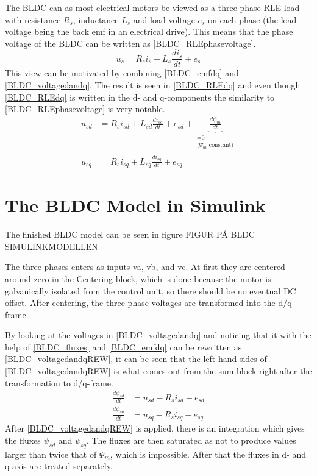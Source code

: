 \documentclass{LTHthesis}
\begin{document}
The BLDC can as most electrical motors be viewed as a three-phase RLE-load with resistance $R_{s}$, inductance $L_{s}$ and load voltage $e_{s}$ on each phase (the load voltage being the back emf in an electrical drive). This means that the phase voltage of the BLDC can be written as \eqref{BLDC_RLEphasevoltage}.
\begin{equation} \label{BLDC_RLEphasevoltage}
u_{s}=R_{s}i_{s}+L_{s}\frac{di_{s}}{dt}+e_{s}
\end{equation}
This view can be motivated by combining \eqref{BLDC_emfdq} and \eqref{BLDC_voltagedandq}. The result is seen in \eqref{BLDC_RLEdq} and even though \eqref{BLDC_RLEdq} is written in the d- and q-components the similarity to \eqref{BLDC_RLEphasevoltage} is very notable.
\begin{subequations} \label{BLDC_RLEdq}
\begin{align}
u_{sd}&=R_si_{sd}+L_{sd}\frac{di_{sd}}{dt}+e_{sd}+\underbrace{\frac{d\psi_m}{dt}}_{\substack{\text{=0}\\\text{$\big(\Psi_m$ constant$\big)$}}}\\
u_{sq}&=R_si_{sq}+L_{sq}\frac{di_{sq}}{dt}+e_{sq}
\end{align}
\end{subequations}

\section{The BLDC Model in Simulink}
The finished BLDC model can be seen in figure FIGUR PÅ BLDC SIMULINKMODELLEN

The three phases enters as inputs va, vb, and vc. At first they are centered around zero in the Centering-block, which is done because the motor is galvanically isolated from the control unit, so there should be no eventual DC offset. After centering, the three phase voltages are transformed into the d/q-frame. 

By looking at the voltages in \eqref{BLDC_voltagedandq} and noticing that it with the help of \eqref{BLDC_fluxes} and \eqref{BLDC_emfdq} can be rewritten as \eqref{BLDC_voltagedandqREW}, it can be seen that the left hand sides of \eqref{BLDC_voltagedandqREW} is what comes out from the sum-block right after the transformation to d/q-frame.
\begin{subequations} \label{BLDC_voltagedandqREW}
\begin{align}
\frac{d\psi_{sd}}{dt}&=u_{sd}-R_si_{sd}-e_{sd}\\
\frac{d\psi_{sq}}{dt}&=u_{sq}-R_si_{sq}-e_{sq}
\end{align}
\end{subequations}
After \eqref{BLDC_voltagedandqREW} is applied, there is an integration which gives the fluxes $\psi_{sd}$ and $\psi_{sq}$. The fluxes are then saturated as not to produce values larger than twice that of $\Psi_m$, which is impossible. After that the fluxes in d- and q-axis are treated separately.
\end{document}
